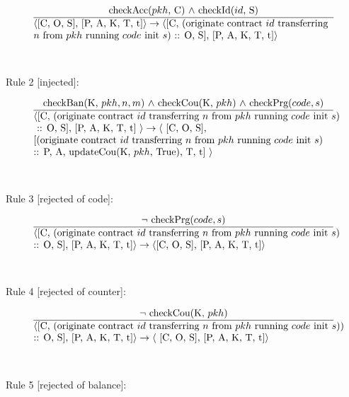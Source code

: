 \documentclass[a4paper]{llncs}
\begin{document}
\begin{equation}{}
\frac{\text{checkAcc($pkh$, C) $\wedge$ checkId($id$, S)}}{\parbox{4.2in}{\text{$\langle$[C, O, S], [P, A, K, T, t]$\rangle \rightarrow \langle$[C, (originate contract ${id}$ transferring} \\
  \text{${n}$ from ${pkh}$} \text{running ${code}$ init ${s}$) :: O, S], [P, A, K, T, t]$\rangle$}}} 
\end{equation}
~\\
~\\
Rule 2 [injected]:

\begin{equation}{}
\frac{\text{checkBan(K, $pkh, n, m$) $\wedge$ checkCou(K, $pkh$) $\wedge$ \text{checkPrg($code, s$)}}}{\parbox{4.2in}{\text{$\langle$[C, (originate contract ${id}$ transferring  ${n}$ from ${pkh}$ running ${code}$ init ${s}$)} \text{ :: O, S], [P, A, K, T, t] $\rangle \rightarrow \langle$ [C, O, S],} \text{[(originate contract ${id}$ transferring ${n}$ from ${pkh}$ running ${code}$ init ${s}$)} \text{:: P, A, updateCou(K, $pkh$, True), T, t] $\rangle$}}} 
\end{equation}
~\\
~\\
Rule 3 [rejected of code]:

\begin{equation}{}
\frac{\text{$\neg$ checkPrg($code, s$)}}{\parbox{4.2in}{\text{$\langle$[C, (originate contract ${id}$ transferring  ${n}$ from ${pkh}$ running ${code}$ init ${s}$)} \text{:: O, S], [P, A, K, T, t]$\rangle \rightarrow \langle$[C, O, S],} \text{[P, A, K, T, t]$\rangle$}}} 
\end{equation}
~\\
~\\
Rule 4 [rejected of counter]:

\begin{equation}{}
\frac{\text{$\neg$ checkCou(K, $pkh$)}}{\parbox{4.2in}{\text{$\langle$[C, (originate contract ${id}$ transferring  ${n}$ from ${pkh}$ running ${code}$ init ${s}$))} \text{:: O, S], [P, A, K, T, t]$\rangle \rightarrow \langle$ [C, O, S],} \text{[P, A, K, T, t]$\rangle$}}} 
\end{equation}
~\\
~\\
Rule 5 [rejected of balance]:
\end{document}
